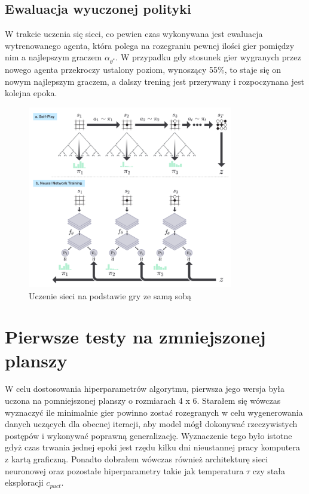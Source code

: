 \documentclass[licencjacka]{pracamgr}
\begin{document}
\subsection{Ewaluacja wyuczonej polityki}

W trakcie uczenia się sieci, co pewien czas wykonywana jest ewaluacja wytrenowanego agenta, która polega na rozegraniu pewnej ilości gier pomiędzy nim a najlepszym graczem $\alpha_{\theta^\ast}$. W przypadku gdy stosunek gier wygranych przez nowego agenta przekroczy ustalony poziom, wynoszący 55\%, to staje się on nowym najlepszym graczem, a dalszy trening jest przerywany i rozpoczynana jest kolejna epoka.


\begin{figure}[ht!]
  \centering
  \includegraphics[width=0.8\textwidth]{alphago-self-play}
  \caption{Uczenie sieci na podstawie gry ze samą sobą}
\end{figure}

\newpage

\section{Pierwsze testy na zmniejszonej planszy}

W celu dostosowania hiperparametrów algorytmu, pierwsza jego wersja była uczona na pomniejszonej planszy o rozmiarach 4 x 6. Starałem się wówczas wyznaczyć ile minimalnie gier powinno zostać rozegranych w celu wygenerowania danych uczących dla obecnej iteracji, aby model mógł dokonywać rzeczywistych postępów i wykonywać poprawną generalizację. Wyznaczenie tego było istotne gdyż czas trwania jednej epoki jest rzędu kilku dni nieustannej pracy komputera z kartą graficzną. Ponadto dobrałem wówczas również architekturę sieci neuronowej oraz pozostałe hiperparametry takie jak temperatura $\tau$ czy stała eksploracji $c_{puct}$.
\end{document}
